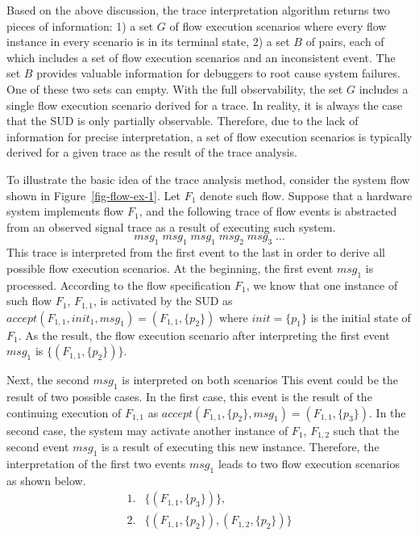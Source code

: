 \documentclass[conference]{IEEEtran}
\begin{document}
Based on the above discussion, the trace interpretation algorithm returns two pieces of information: 1) a set $G$ of flow execution scenarios where every flow instance in every scenario is in its terminal state, 2) a set $B$ of pairs, each of which includes a set of flow execution scenarios and an inconsistent event.  The set $B$ provides valuable information for debuggers to root cause system failures.  One of these two sets can empty.   With the full observability, the set $G$ includes a single flow execution scenario derived for a trace.  In reality, it is always the case that the SUD is only partially observable.  Therefore, due to the lack of information for precise interpretation, a set of flow execution scenarios is typically derived for a given trace as the result of the trace analysis.    


To illustrate the basic idea of the trace analysis method, consider the system flow shown in Figure~\ref{fig-flow-ex-1}.  Let $F_1$ denote such flow.  Suppose that a hardware system implements flow $F_1$, and the following trace of flow events is abstracted from an observed signal trace as a result of executing such system.     
\[
\mathit{msg}_1\;\mathit{msg}_1\;\mathit{msg}_1\;\mathit{msg}_2\;\mathit{msg}_3\;\ldots
\]  
This trace is interpreted from the first event to the last in order to derive all possible flow execution scenarios.  At the beginning, the first event $\mathit{msg}_1$ is processed.  According to the flow specification $F_1$, we know that one instance of such flow $F_1$, $F_{1,1}$,  is activated by the SUD as $\mathit{accept}(F_{1,1}, init_1, \mathit{msg}_1) = (F_{1,1}, \{p_2\})$ where $\mathit{init} = \{p_1\}$ is the initial state of $F_1$.  As the result, the flow execution scenario after interpreting the first event $\mathit{msg_1}$ is $\{(F_{1,1}, \{p_2\})\}$.  

Next, the second $\mathit{msg}_1$ is interpreted on both scenarios   This event could be the result of two possible cases.  In the first case, this event is the result of the continuing execution of $F_{1,1}$ as $\mathit{accept}(F_{1,1}, \{p_2\}, \mathit{msg}_1) = (F_{1,1}, \{p_3\})$.  In the second case, the system may activate another instance of $F_1$, $F_{1,2}$ such that the second event $\mathit{msg_1}$ is a result of executing this new instance.  Therefore, the interpretation of the first two events $\mathit{msg}_1$ leads to two flow execution scenarios as shown below.
\[
\label{tr-analy-s1}\tag{1}
\begin{array}{cl}
1. & \{(F_{1,1}, \{p_3\})\},\\
2. & \{(F_{1,1}, \{p_2\}), (F_{1,2}, \{p_2\})\} 
\end{array}
\]
\end{document}
